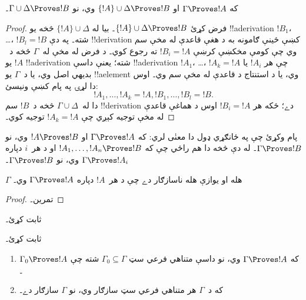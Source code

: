 \documentclass[../../../include/open-logic-section]{subfiles}
\begin{document}
\begin{prop}[انتقال]
که $\Gamma \Proves !A$ او $\{!A\} \cup \Delta \Proves !B$ وي،
نو $\Gamma \cup \Delta \Proves !B$۔
\end{prop}

\begin{proof}
  فرض کړئ $\{!A\} \cup \Delta \Proves !B$۔ بيا له
  $\{!A\} \cup \Delta$ څخه يو !!a{derivation}
  $!B_1$، \dots، $!B_l = !B$ شته۔ په دې !!{derivation} کښې ځينې
  ګامونه به د هغې قاعدې له مخې سم وي چې کومې مخکښې کرښې
  $!B_i = !A$ ته رجوع کوي۔ د فرض له مخې له~$\Gamma$ څخه د~$!A$
  يو !!a{derivation} شته؛ يعنې داسې !!a{derivation}
  $!A_1$، \dots، $!A_k = !A$ چې هر $!A_i$ يا بديهي اصل وي، يا
  د~$\Gamma$ يو !!a{element} وي، يا د استنتاج د قاعدې له مخې سم
  وي۔ اوس دا لړۍ په پام کښې ونيسئ:
  \[
  !A_1, \dots, !A_k = !A, !B_1, \dots, !B_l = !B.
  \]
  دا له~$\Gamma \cup \Delta$ څخه د~$!B$ سم !!{derivation} دے؛ ځکه
  هر $!B_i = !A$ اوس د هماغې قاعدې له مخې توجيه کېږي چې
  $!A_k = !A$ توجيه کوي۔
\end{proof}

پام وکړئ چې په ځانګړي ډول دا معنٰی لري: که
$\Gamma \Proves !A$ او $!A \Proves !B$ وي، نو
$\Gamma \Proves !B$۔ له دې څخه دا هم راځي چې که
$!A_1, \dots, !A_n \Proves !B$ او د هر~$i$ دپاره
$\Gamma \Proves !A_i$ وي، نو $\Gamma \Proves !B$۔

\begin{prop}
$\Gamma$ هله او يوازې هله ناسازګار دے چې د هر~$!A$ دپاره
$\Gamma \Proves !A$ وي۔
\end{prop}

\begin{proof}
تمرين۔
\end{proof}

\begin{prob}
 ثابت کړئ۔
\end{prob}
\tagendprob

\begin{prob}
 ثابت کړئ۔
\end{prob}
\tagendprob

\begin{prop}[تراکم]
  \begin{enumerate}
  \item که $\Gamma \Proves !A$ وي، نو داسې متناهي فرعي سټ
    $\Gamma_0 \subseteq \Gamma$ شته چې $\Gamma_0 \Proves !A$۔
  \item که د~$\Gamma$ هر متناهي فرعي سټ سازګار وي، نو $\Gamma$
    سازګار دے۔
  \end{enumerate}
\end{prop}
\end{document}
